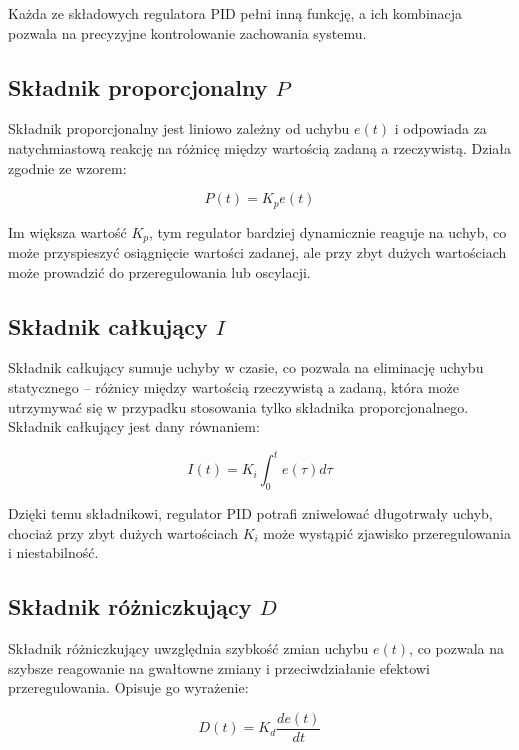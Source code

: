 Każda ze składowych regulatora PID pełni inną funkcję, a ich kombinacja pozwala na precyzyjne kontrolowanie zachowania systemu.

\subsection{Składnik proporcjonalny $P$}

Składnik proporcjonalny jest liniowo zależny od uchybu $e(t)$ i odpowiada za natychmiastową reakcję na różnicę między wartością zadaną a rzeczywistą. Działa zgodnie ze wzorem:

\begin{equation}
P(t) = K_p e(t)
\end{equation}

Im większa wartość $K_p$, tym regulator bardziej dynamicznie reaguje na uchyb, co może przyspieszyć osiągnięcie wartości zadanej, ale przy zbyt dużych wartościach może prowadzić do przeregulowania lub oscylacji.

\subsection{Składnik całkujący $I$}

Składnik całkujący sumuje uchyby w czasie, co pozwala na eliminację uchybu statycznego – różnicy między wartością rzeczywistą a zadaną, która może utrzymywać się w przypadku stosowania tylko składnika proporcjonalnego. Składnik całkujący jest dany równaniem:

\begin{equation}
I(t) = K_i \int_{0}^{t} e(\tau) d\tau
\end{equation}

Dzięki temu składnikowi, regulator PID potrafi zniwelować długotrwały uchyb, chociaż przy zbyt dużych wartościach $K_i$ może wystąpić zjawisko przeregulowania i niestabilność.

\subsection{Składnik różniczkujący $D$}

Składnik różniczkujący uwzględnia szybkość zmian uchybu $e(t)$, co pozwala na szybsze reagowanie na gwałtowne zmiany i przeciwdziałanie efektowi przeregulowania. Opisuje go wyrażenie:

\begin{equation}
D(t) = K_d \frac{de(t)}{dt}
\end{equation}


